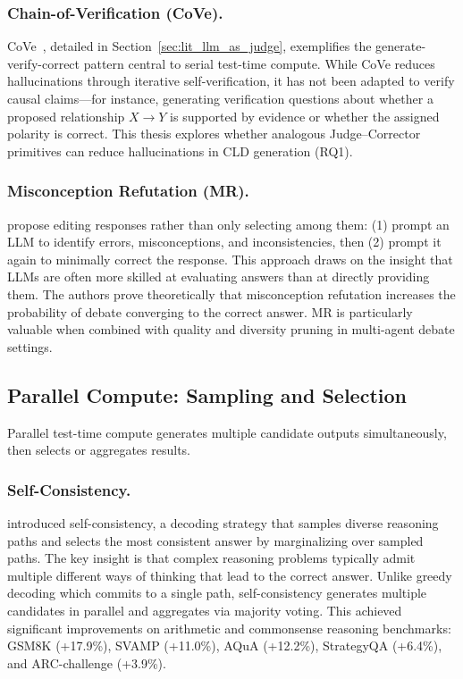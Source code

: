 \subsubsection{Chain-of-Verification (CoVe).} CoVe~\citep{dhuliawala2024chain}, detailed in Section~\ref{sec:lit_llm_as_judge}, exemplifies the generate-verify-correct pattern central to serial test-time compute. While CoVe reduces hallucinations through iterative self-verification, it has not been adapted to verify causal claims---for instance, generating verification questions about whether a proposed relationship $X \rightarrow Y$ is supported by evidence or whether the assigned polarity is correct. This thesis explores whether analogous Judge--Corrector primitives can reduce hallucinations in CLD generation (RQ1).

\subsubsection{Misconception Refutation (MR).} \citet{estornell2024multillmdebate} propose editing responses rather than only selecting among them: (1) prompt an LLM to identify errors, misconceptions, and inconsistencies, then (2) prompt it again to minimally correct the response. This approach draws on the insight that LLMs are often more skilled at evaluating answers than at directly providing them. The authors prove theoretically that misconception refutation increases the probability of debate converging to the correct answer. MR is particularly valuable when combined with quality and diversity pruning in multi-agent debate settings.

\subsection{Parallel Compute: Sampling and Selection}

Parallel test-time compute generates multiple candidate outputs simultaneously, then selects or aggregates results.

\subsubsection{Self-Consistency.} \citet{wang2023selfconsistency} introduced self-consistency, a decoding strategy that samples diverse reasoning paths and selects the most consistent answer by marginalizing over sampled paths. The key insight is that complex reasoning problems typically admit multiple different ways of thinking that lead to the correct answer. Unlike greedy decoding which commits to a single path, self-consistency generates multiple candidates in parallel and aggregates via majority voting. This achieved significant improvements on arithmetic and commonsense reasoning benchmarks: GSM8K (+17.9\%), SVAMP (+11.0\%), AQuA (+12.2\%), StrategyQA (+6.4\%), and ARC-challenge (+3.9\%).

